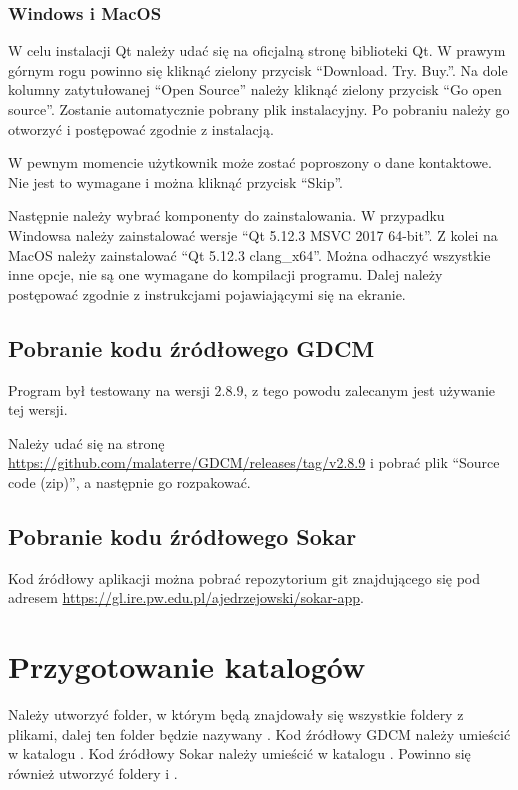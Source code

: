 \subsubsection*{Windows i MacOS}

\par
W celu instalacji Qt należy udać się na oficjalną stronę biblioteki Qt.
W prawym górnym rogu powinno się kliknąć zielony przycisk \enquote{Download. Try. Buy.}.
Na dole kolumny zatytułowanej \enquote{Open Source} należy kliknąć zielony przycisk \enquote{Go open source}.
Zostanie automatycznie pobrany plik instalacyjny.
Po pobraniu należy go otworzyć i postępować zgodnie z instalacją.
\par
W pewnym momencie użytkownik może zostać poproszony o dane kontaktowe.
Nie jest to wymagane i można kliknąć przycisk \enquote{Skip}.
\par
Następnie należy wybrać komponenty do zainstalowania.
W przypadku Windowsa należy zainstalować wersje \enquote{Qt 5.12.3 MSVC 2017 64-bit}.
Z kolei na MacOS należy zainstalować \enquote{Qt 5.12.3 clang\_x64}.
Można odhaczyć wszystkie inne opcje, nie są one wymagane do kompilacji programu.
Dalej należy postępować zgodnie z instrukcjami pojawiającymi się na ekranie.

\subsection{Pobranie kodu źródłowego GDCM}

Program był testowany na wersji $2.8.9$, z tego powodu zalecanym jest używanie tej wersji.
\par
Należy udać się na stronę \url{https://github.com/malaterre/GDCM/releases/tag/v2.8.9} i pobrać plik \enquote{Source code (zip)}, a następnie go rozpakować.

\subsection{Pobranie kodu źródłowego Sokar}

Kod źródłowy aplikacji można pobrać repozytorium git znajdującego się pod adresem \url{https://gl.ire.pw.edu.pl/ajedrzejowski/sokar-app}.

\section{Przygotowanie katalogów}

Należy utworzyć folder, w którym będą znajdowały się wszystkie foldery z plikami, dalej ten folder będzie nazywany .
Kod źródłowy GDCM należy umieścić w katalogu .
Kod źródłowy Sokar należy umieścić w katalogu .
Powinno się również utworzyć foldery  i .

